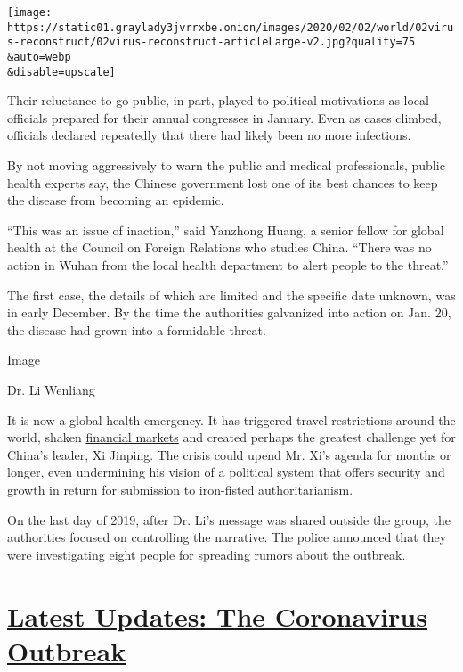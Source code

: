 \texttt{[image: https://static01.graylady3jvrrxbe.onion/images/2020/02/02/world/02virus-reconstruct/02virus-reconstruct-articleLarge-v2.jpg?quality=75\\\&auto=webp\\\&disable=upscale]}

Their reluctance to go public, in part, played to political motivations
as local officials prepared for their annual congresses in January. Even
as cases climbed, officials declared repeatedly that there had likely
been no more infections.

By not moving aggressively to warn the public and medical professionals,
public health experts say, the Chinese government lost one of its best
chances to keep the disease from becoming an epidemic.

``This was an issue of inaction,'' said Yanzhong Huang, a senior fellow
for global health at the Council on Foreign Relations who studies China.
``There was no action in Wuhan from the local health department to alert
people to the threat.''

The first case, the details of which are limited and the specific date
unknown, was in early December. By the time the authorities galvanized
into action on Jan. 20, the disease had grown into a formidable threat.

Image

Dr. Li Wenliang

It is now a global health emergency. It has triggered travel
restrictions around the world, shaken
\href{https://www.nytimes3xbfgragh.onion/2020/01/29/business/china-coronavirus-economy.html}{financial
markets} and created perhaps the greatest challenge yet for China's
leader, Xi Jinping. The crisis could upend Mr. Xi's agenda for months or
longer, even undermining his vision of a political system that offers
security and growth in return for submission to iron-fisted
authoritarianism.

On the last day of 2019, after Dr. Li's message was shared outside the
group, the authorities focused on controlling the narrative. The police
announced that they were investigating eight people for spreading rumors
about the outbreak.

\hypertarget{latest-updates-the-coronavirus-outbreak}{%
\section{\texorpdfstring{\href{https://www.nytimes3xbfgragh.onion/2020/08/20/world/coronavirus-covid.html?action=click\&pgtype=Article\&state=default\&region=MAIN_CONTENT_1\&context=storylines_live_updates}{Latest
Updates: The Coronavirus
Outbreak}}{Latest Updates: The Coronavirus Outbreak}}\label{latest-updates-the-coronavirus-outbreak}}

